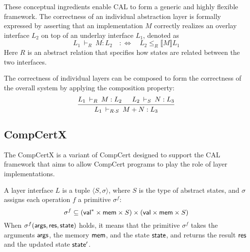 These conceptual ingredients
enable CAL to form a generic and highly flexible framework.
The correctness of an individual
abstraction layer is formally expressed
by asserting that
an implementation $M$ correctly
realizes an overlay interface $L_2$
on top of an underlay interface $L_1$,
denoted as
\[
  L_1 \:\vdash_R\: M : L_2
  \quad
  :\Leftrightarrow
  \quad
  L_2 \le_R \llbracket M \rrbracket L_1
\]
Here $R$
is an abstract relation
that specifies how states are related
between the two interfaces.

The correctness of individual layers
can be composed to form the correctness
of the overall system
by applying the composition property:
\[
  \begin{prooftree}
    \hypo{L_1 \:\vdash_R\: M : L_2}
    \hypo{L_2 \:\vdash_S\: N : L_3}
    \infer2{L_1 \:\vdash_{R \cdot S}\: M \mathbin+ N : L_3}
  \end{prooftree}
\]








\subsection{CompCertX}

The CompCertX is a variant of CompCert
designed to support the CAL framework
that aims to allow CompCert programs
to play the role of layer implementations.

A layer interface $L$ is a tuple $\langle S, \sigma \rangle$,
where $S$ is the type of abstract states,
and $\sigma$ assigns each operation $f$ a primitive
$\sigma^f$:
\[
  \sigma^f \subseteq ( \mathsf{val} ^* \times  \mathsf{mem}  \times S)
  \times ( \mathsf{val}  \times  \mathsf{mem}  \times S)
\]
When $\sigma^f( \mathsf{args} ,  \mathsf{res} ,  \mathsf{state} )$
holds,
it means that the primitive $\sigma^f$
takes the arguments $ \mathsf{args} $,
the memory $ \mathsf{mem} $,
and the state $ \mathsf{state} $,
and returns the result $ \mathsf{res} $
and the updated state $ \mathsf{state'} $.

